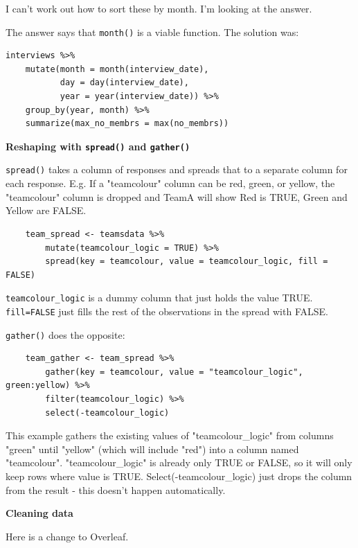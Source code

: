 \documentclass[12pt]{article}
\begin{document}
\begin{addmargin}[1cm]{0cm}
\begin{enumerate}
I can't work out how to sort these by month. I'm looking at the answer. 

The answer says that \texttt{month()} is a viable function. The solution was: \color{gray}\begin{verbatim}
interviews %>%
    mutate(month = month(interview_date),
           day = day(interview_date),
           year = year(interview_date)) %>%
    group_by(year, month) %>%
    summarize(max_no_membrs = max(no_membrs))
\end{verbatim}
\end{enumerate}

\end{addmargin}
\color{black}
\textbf{Reshaping with \texttt{spread()} and \texttt{gather()}}

\texttt{spread()} takes a column of responses and spreads that to a separate column for each response. E.g. If a "teamcolour" column can be red, green, or yellow, the "teamcolour" column is dropped and TeamA will show Red is TRUE, Green and Yellow are FALSE.
\begin{verbatim}
    team_spread <- teamsdata %>%
        mutate(teamcolour_logic = TRUE) %>%
        spread(key = teamcolour, value = teamcolour_logic, fill = FALSE)
\end{verbatim}

\texttt{teamcolour\_logic} is a dummy column that just holds the value TRUE. \texttt{fill=FALSE} just fills the rest of the observations in the spread with FALSE.

\vspace{2em}
\texttt{gather()} does the opposite:
\vspace{-1.5em}\begin{verbatim}
    team_gather <- team_spread %>%
        gather(key = teamcolour, value = "teamcolour_logic", green:yellow) %>%
        filter(teamcolour_logic) %>%
        select(-teamcolour_logic)
\end{verbatim}

This example gathers the existing values of "teamcolour\_logic" from columns "green" until "yellow" (which will include "red") into a column named "teamcolour". "teamcolour\_logic" is already only TRUE or FALSE, so it will only keep rows where value is TRUE. Select(-teamcolour\_logic) just drops the column from the result - this doesn't happen automatically.

\textbf{Cleaning data}


\newpage

Here is a change to Overleaf.
\end{document}

